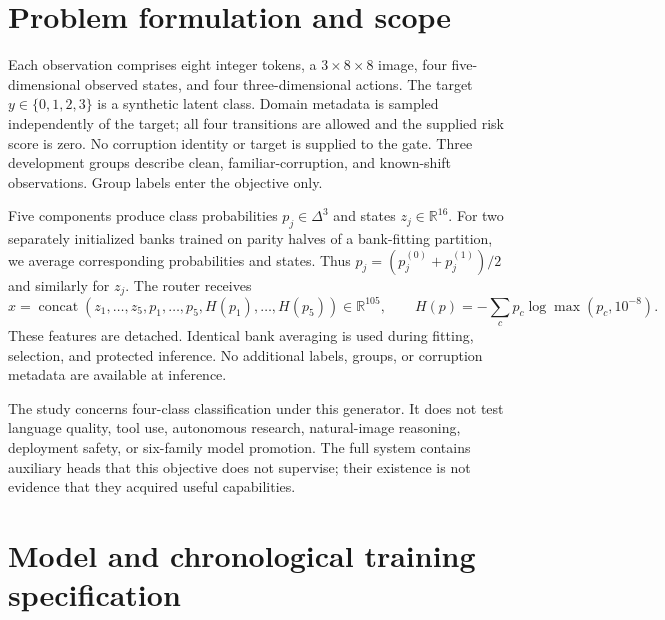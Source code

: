 \section{Problem formulation and scope}
Each observation comprises eight integer tokens, a $3\times8\times8$ image,
four five-dimensional observed states, and four three-dimensional actions.
The target $y\in\{0,1,2,3\}$ is a synthetic latent class. Domain metadata is
sampled independently of the target; all four transitions are allowed and the
supplied risk score is zero. No corruption identity or target is supplied to
the gate. Three development groups describe clean, familiar-corruption, and
known-shift observations. Group labels enter the objective only.

Five components produce class probabilities $p_j\in\Delta^3$ and states
$z_j\in\mathbb R^{16}$. For two separately initialized banks trained on parity
halves of a bank-fitting partition, we average corresponding probabilities
and states. Thus $p_j=(p_j^{(0)}+p_j^{(1)})/2$ and similarly for $z_j$.
The router receives
\begin{equation}
 x=\operatorname{concat}(z_1,\ldots,z_5,p_1,\ldots,p_5,H(p_1),\ldots,H(p_5))
 \in\mathbb R^{105},\qquad H(p)=-\sum_c p_c\log\max(p_c,10^{-8}).
\end{equation}
These features are detached. Identical bank averaging is used during fitting,
selection, and protected inference. No additional labels, groups, or corruption
metadata are available at inference.

The study concerns four-class classification under this generator. It does not
test language quality, tool use, autonomous research, natural-image reasoning,
deployment safety, or six-family model promotion. The full system contains
auxiliary heads that this objective does not supervise; their existence is not
evidence that they acquired useful capabilities.

\section{Model and chronological training specification}
